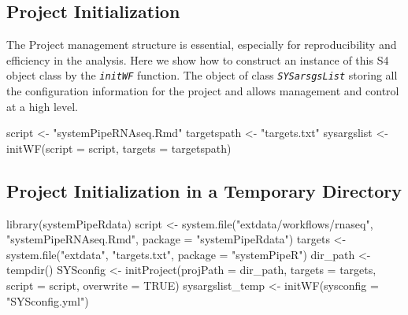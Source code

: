 \documentclass[14pt,]{article}
\newcommand{\hlnum}[1]{\textcolor[rgb]{0.816,0.125,0.439}{#1}}%
\newcommand{\hlstr}[1]{\textcolor[rgb]{0.251,0.627,0.251}{#1}}%
\newcommand{\hlstd}[1]{\textcolor[rgb]{0.251,0.251,0.251}{#1}}%
\newenvironment{Shaded}{\begin{myshaded}}{\end{myshaded}}
\newcommand{\ConstantTok}[1]{\hlnum{#1}}
\newcommand{\StringTok}[1]{\hlstr{#1}}
\newcommand{\OtherTok}[1]{{#1}}
\newcommand{\FunctionTok}[1]{\hlstd{#1}}
\newcommand{\AttributeTok}[1]{{#1}}
\newcommand{\NormalTok}[1]{\hlstd{#1}}
\begin{document}
\hypertarget{project-initialization}{%
\subsection{Project Initialization}\label{project-initialization}}

The Project management structure is essential, especially for reproducibility and efficiency in the analysis. Here we show how to construct an instance of this S4 object class by the \emph{\texttt{initWF}} function. The object of class \emph{\texttt{SYSarsgsList}} storing all the configuration information for the project and allows management and control at a high level.

\begin{Shaded}
\begin{Highlighting}[]
\NormalTok{script }\OtherTok{\textless{}{-}} \StringTok{"systemPipeRNAseq.Rmd"}
\NormalTok{targetspath }\OtherTok{\textless{}{-}} \StringTok{"targets.txt"}
\NormalTok{sysargslist }\OtherTok{\textless{}{-}} \FunctionTok{initWF}\NormalTok{(}\AttributeTok{script =}\NormalTok{ script, }\AttributeTok{targets =}\NormalTok{ targetspath)}
\end{Highlighting}
\end{Shaded}

\hypertarget{project-initialization-in-a-temporary-directory}{%
\subsection{Project Initialization in a Temporary Directory}\label{project-initialization-in-a-temporary-directory}}

\begin{Shaded}
\begin{Highlighting}[]
\FunctionTok{library}\NormalTok{(systemPipeRdata)}
\NormalTok{script }\OtherTok{\textless{}{-}} \FunctionTok{system.file}\NormalTok{(}\StringTok{"extdata/workflows/rnaseq"}\NormalTok{, }\StringTok{"systemPipeRNAseq.Rmd"}\NormalTok{, }\AttributeTok{package =} \StringTok{"systemPipeRdata"}\NormalTok{)}
\NormalTok{targets }\OtherTok{\textless{}{-}} \FunctionTok{system.file}\NormalTok{(}\StringTok{"extdata"}\NormalTok{, }\StringTok{"targets.txt"}\NormalTok{, }\AttributeTok{package =} \StringTok{"systemPipeR"}\NormalTok{)}
\NormalTok{dir\_path }\OtherTok{\textless{}{-}} \FunctionTok{tempdir}\NormalTok{()}
\NormalTok{SYSconfig }\OtherTok{\textless{}{-}} \FunctionTok{initProject}\NormalTok{(}\AttributeTok{projPath =}\NormalTok{ dir\_path, }\AttributeTok{targets =}\NormalTok{ targets, }\AttributeTok{script =}\NormalTok{ script, }
    \AttributeTok{overwrite =} \ConstantTok{TRUE}\NormalTok{)}
\NormalTok{sysargslist\_temp }\OtherTok{\textless{}{-}} \FunctionTok{initWF}\NormalTok{(}\AttributeTok{sysconfig =} \StringTok{"SYSconfig.yml"}\NormalTok{)}
\end{Highlighting}
\end{Shaded}
\end{document}
